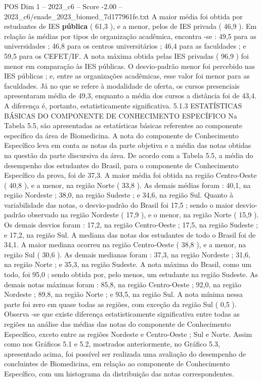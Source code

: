 \begin{textsample}{POS Dim 1 – 2023\_c6 – Score -2.00 – 2023\_c6/enade\_2023\_biomed\_7d177961fe.txt}
A maior média foi obtida por estudantes de IES \textbf{pública} ( 61,3 ), e a menor, pelos de IES privada ( 46,9 ).
Em relação às médias por tipos de organização acadêmica, encontra -se : 49,5 para as universidades ; 46,8 para os centros universitários ; 46,4 para as faculdades ; e 59,5 para os CEFET/IF.
A nota máxima obtida pelas IES privadas ( 96,9 ) foi menor em comparação às IES públicas.
O desvio-padrão menor foi percebido nas IES públicas ; e, entre as organizações acadêmicas, esse valor foi menor para as faculdades.
Já no que se refere à modalidade de oferta, os cursos presenciais apresentaram média de 49,3, enquanto a média dos cursos a distância foi de 43,4.
A diferença é, portanto, estatisticamente significativa. 5.1.3 ESTATÍSTICAS BÁSICAS DO COMPONENTE DE CONHECIMENTO ESPECÍFICO Na Tabela 5.5, são apresentadas as estatísticas básicas referentes ao componente específico da área de Biomedicina.
A nota do componente de Conhecimento Específico leva em conta as notas da parte objetiva e a média das notas obtidas na questão da parte discursiva da área.
De acordo com a Tabela 5.5, a média do desempenho dos estudantes do Brasil, para o componente de Conhecimento Específico da prova, foi de 37,3.
A maior média foi obtida na região Centro-Oeste ( 40,8 ), e a menor, na região Norte ( 33,8 ).
As demais médias foram : 40,1, na região Nordeste ; 38,0, na região Sudeste ; e 34,6, na região Sul.
Quanto à variabilidade das notas, o desvio-padrão do Brasil foi 17,5 ; sendo o maior desvio-padrão observado na região Nordeste ( 17,9 ), e o menor, na região Norte ( 15,9 ).
Os demais desvios foram : 17,2, na região Centro-Oeste ; 17,5, na região Sudeste ; e 17,2, na região Sul.
A mediana das notas dos estudantes de todo o Brasil foi de 34,1.
A maior mediana ocorreu na região Centro-Oeste ( 38,8 ), e a menor, na região Sul ( 30,6 ).
As demais medianas foram : 37,3, na região Nordeste ; 31,6, na região Norte ; e 35,3, na região Sudeste.
A nota máxima do Brasil, como um todo, foi 95,0 ; sendo obtida por, pelo menos, um estudante na região Sudeste.
As demais notas máximas foram : 85,8, na região Centro-Oeste ; 92,0, na região Nordeste ; 89,8, na região Norte ; e 93,5, na região Sul.
A nota mínima nessa parte foi zero em quase todas as regiões, com exceção da região Sul ( 0,5 ).
Observa -se que existe diferença estatisticamente significativa entre todas as regiões na análise das médias das notas do componente de Conhecimento Específico, exceto entre as regiões Nordeste e Centro-Oeste ; Sul e Norte.
Assim como nos Gráficos 5.1 e 5.2, mostrados anteriormente, no Gráfico 5.3, apresentado acima, foi possível ser realizada uma avaliação do desempenho de concluintes de Biomedicina, em relação ao componente de Conhecimento Específico, com um histograma da distribuição das notas correspondentes.

\end{textsample}
